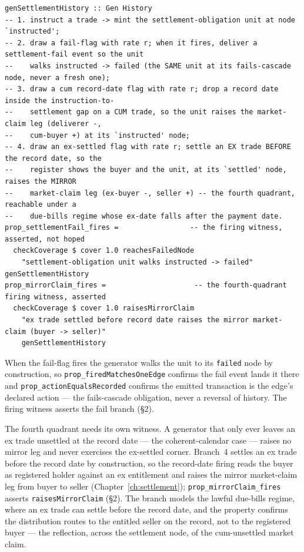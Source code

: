 \begin{lstlisting}
genSettlementHistory :: Gen History
-- 1. instruct a trade -> mint the settlement-obligation unit at node `instructed';
-- 2. draw a fail-flag with rate r; when it fires, deliver a settlement-fail event so the unit
--    walks instructed -> failed (the SAME unit at its fails-cascade node, never a fresh one);
-- 3. draw a cum record-date flag with rate r; drop a record date inside the instruction-to-
--    settlement gap on a CUM trade, so the unit raises the market-claim leg (deliverer -,
--    cum-buyer +) at its `instructed' node;
-- 4. draw an ex-settled flag with rate r; settle an EX trade BEFORE the record date, so the
--    register shows the buyer and the unit, at its `settled' node, raises the MIRROR
--    market-claim leg (ex-buyer -, seller +) -- the fourth quadrant, reachable under a
--    due-bills regime whose ex-date falls after the payment date.
prop_settlementFail_fires =                 -- the firing witness, asserted, not hoped
  checkCoverage $ cover 1.0 reachesFailedNode
    "settlement-obligation unit walks instructed -> failed" genSettlementHistory
prop_mirrorClaim_fires =                     -- the fourth-quadrant firing witness, asserted
  checkCoverage $ cover 1.0 raisesMirrorClaim
    "ex trade settled before record date raises the mirror market-claim (buyer -> seller)"
    genSettlementHistory
\end{lstlisting}

When the fail-flag fires the generator walks the unit to its \texttt{failed} node by
construction, so \texttt{prop\_firedMatchesOneEdge} confirms the fail event lands it there
and \texttt{prop\_actionEqualsRecorded} confirms the emitted transaction is the edge's
declared action --- the fails-cascade obligation, never a reversal of history. The firing
witness asserts the fail branch (\S 2).

The fourth quadrant needs its own witness. A generator that only ever leaves an ex trade
unsettled at the record date --- the coherent-calendar case --- raises no mirror leg and
never exercises the ex-settled corner. Branch~4 settles an ex trade before the record date
by construction, so the record-date firing reads the buyer as registered holder against an
ex entitlement and raises the mirror market-claim leg from buyer to seller
(Chapter~\ref{ch:settlement}); \texttt{prop\_mirrorClaim\_fires} asserts
\texttt{raisesMirrorClaim} (\S 2). The branch
models the lawful due-bills regime, where an ex trade can settle before the record date, and
the property confirms the distribution routes to the entitled seller on the record, not to
the registered buyer --- the reflection, across the settlement node, of the cum-unsettled
market claim.

